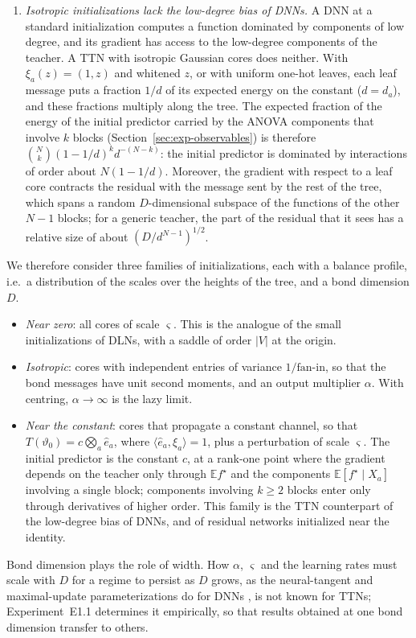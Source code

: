 \documentclass[11pt]{article}
\newcommand{\E}{\mathbb{E}}
\theoremstyle{definition}
\numberwithin{equation}{section}
\begin{document}
\begin{enumerate}[label=(\roman*),leftmargin=*]
\item \emph{Isotropic initializations lack the low-degree bias of DNNs.} A DNN at a standard initialization computes a function dominated by components of low degree, and its gradient has access to the low-degree components of the teacher. A TTN with isotropic Gaussian cores does neither. With $\xi_a(z)=(1,z)$ and whitened $z$, or with uniform one-hot leaves, each leaf message puts a fraction $1/d$ of its expected energy on the constant ($d=d_a$), and these fractions multiply along the tree. The expected fraction of the energy of the initial predictor carried by the ANOVA components that involve $k$ blocks (Section~\ref{sec:exp-observables}) is therefore $\binom Nk(1-1/d)^kd^{-(N-k)}$: the initial predictor is dominated by interactions of order about $N(1-1/d)$. Moreover, the gradient with respect to a leaf core contracts the residual with the message sent by the rest of the tree, which spans a random $D$-dimensional subspace of the functions of the other $N-1$ blocks; for a generic teacher, the part of the residual that it sees has a relative size of about $(D/d^{N-1})^{1/2}$.
\end{enumerate}
We therefore consider three families of initializations, each with a balance profile, i.e.\ a distribution of the scales over the heights of the tree, and a bond dimension $D$.
\begin{itemize}[leftmargin=2.8em]
\item[(Z)] \emph{Near zero}: all cores of scale $\varsigma$. This is the analogue of the small initializations of DLNs, with a saddle of order $|V|$ at the origin.
\item[(I)] \emph{Isotropic}: cores with independent entries of variance $1/\text{fan-in}$, so that the bond messages have unit second moments, and an output multiplier $\alpha$. With centring, $\alpha\to\infty$ is the lazy limit.
\item[(C)] \emph{Near the constant}: cores that propagate a constant channel, so that $T(\vartheta_0)=c\bigotimes_a\hat e_a$, where $\langle\hat e_a,\xi_a\rangle=1$, plus a perturbation of scale $\varsigma$. The initial predictor is the constant $c$, at a rank-one point where the gradient depends on the teacher only through $\E f^\star$ and the components $\E[f^\star\mid X_a]$ involving a single block; components involving $k\ge2$ blocks enter only through derivatives of higher order. This family is the TTN counterpart of the low-degree bias of DNNs, and of residual networks initialized near the identity.
\end{itemize}
Bond dimension plays the role of width. How $\alpha$, $\varsigma$ and the learning rates must scale with $D$ for a regime to persist as $D$ grows, as the neural-tangent and maximal-update parameterizations do for DNNs \citep{yang2021tensor}, is not known for TTNs; Experiment~E1.1 determines it empirically, so that results obtained at one bond dimension transfer to others.
\end{document}
